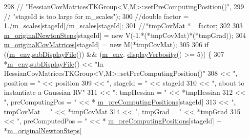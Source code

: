 \begin{DoxyCode}
298       \textcolor{comment}{//                    "HessianCovMatricesTKGroup<V,M>::setPreComputingPosition()",}
299       \textcolor{comment}{//                    "stageId is too large for m\_scales");}
300       \textcolor{comment}{//double factor = 1./m\_scales[stageId]/m\_scales[stageId];}
301       \textcolor{comment}{//*tmpCovMat *= factor;}
302 
303       \hyperlink{class_q_u_e_s_o_1_1_hessian_cov_matrices_t_k_group_a4c0fe3171a35cdd453a4e23e1438ddf9}{m\_originalNewtonSteps}[stageId] = \textcolor{keyword}{new} V(-1.*(*tmpCovMat)*(*tmpGrad));
304       \hyperlink{class_q_u_e_s_o_1_1_hessian_cov_matrices_t_k_group_acc7219917faf933e77694894856fa646}{m\_originalCovMatrices}[stageId] = \textcolor{keyword}{new} M(*tmpCovMat);
305 
306       \textcolor{keywordflow}{if} ((\hyperlink{class_q_u_e_s_o_1_1_base_t_k_group_a2bce5e8aa5c844d4332a0e73cf00a1f9}{m\_env}.\hyperlink{class_q_u_e_s_o_1_1_base_environment_a8a0064746ae8dddfece4229b9ad374d6}{subDisplayFile}()) && (\hyperlink{class_q_u_e_s_o_1_1_base_t_k_group_a2bce5e8aa5c844d4332a0e73cf00a1f9}{m\_env}.
      \hyperlink{class_q_u_e_s_o_1_1_base_environment_a1fe5f244fc0316a0ab3e37463f108b96}{displayVerbosity}() >= 5)) \{
307         *\hyperlink{class_q_u_e_s_o_1_1_base_t_k_group_a2bce5e8aa5c844d4332a0e73cf00a1f9}{m\_env}.\hyperlink{class_q_u_e_s_o_1_1_base_environment_a8a0064746ae8dddfece4229b9ad374d6}{subDisplayFile}() << \textcolor{stringliteral}{"In
       HessianCovMatricesTKGroup<V,M>::setPreComputingPosition()"}
308                                << \textcolor{stringliteral}{", position = "}        << position
309                                << \textcolor{stringliteral}{", stageId = "}         << stageId
310                                << \textcolor{stringliteral}{", about to instantiate a Gaussian RV"}
311                                << \textcolor{stringliteral}{": tmpHessian = "}      << *tmpHessian
312                                << \textcolor{stringliteral}{", preComputingPos = "} << *
      \hyperlink{class_q_u_e_s_o_1_1_base_t_k_group_a93d7fe55e30a7c6f209b01cb8a67e322}{m\_preComputingPositions}[stageId]
313                                << \textcolor{stringliteral}{", tmpCovMat = "}       << *tmpCovMat
314                                << \textcolor{stringliteral}{", tmpGrad = "}         << *tmpGrad
315                                << \textcolor{stringliteral}{", preComputedPos = "}  << *
      \hyperlink{class_q_u_e_s_o_1_1_base_t_k_group_a93d7fe55e30a7c6f209b01cb8a67e322}{m\_preComputingPositions}[stageId] + *\hyperlink{class_q_u_e_s_o_1_1_hessian_cov_matrices_t_k_group_a4c0fe3171a35cdd453a4e23e1438ddf9}{m\_originalNewtonSteps}[

\end{DoxyCode}
